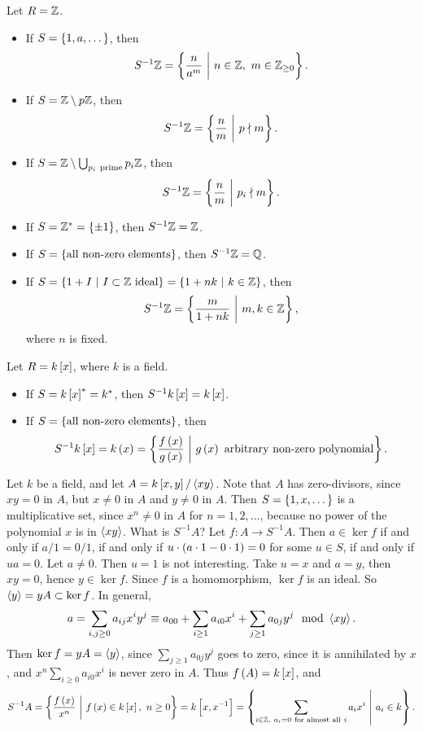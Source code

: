 \begin{example*}
Let $ R = \mathbb{Z} $.
\begin{itemize}
\item If $ S = \cbr{1, a, \dots} $, then
$$ S^{-1}\ZZ = \cbr{\dfrac{n}{a^m} \st n \in \ZZ, \ m \in \ZZ_{\ge 0}}. $$
\item If $ S = \mathbb{Z} \setminus p\mathbb{Z} $, then
$$ S^{-1}\ZZ = \cbr{\dfrac{n}{m} \st p \nmid m}. $$
\item If $ S = \ZZ \setminus \bigcup_{p_i \ \text{prime}} p_i\ZZ $, then
$$ S^{-1}\ZZ = \cbr{\dfrac{n}{m} \st p_i \nmid m}. $$
\item If $ S = \ZZ^* = \cbr{\pm 1} $, then $ S^{-1}\mathbb{Z} = \mathbb{Z} $.
\item If $ S = \cbr{\text{all non-zero elements}} $, then $ S^{-1}\mathbb{Z} = \mathbb{Q} $.
\item If $ S = \cbr{1 + I \st I \subset \ZZ \ \text{ideal}} = \cbr{1 + nk \st k \in \ZZ} $, then
$$ S^{-1}\ZZ = \cbr{\dfrac{m}{1 + nk} \st m, k \in \ZZ}, $$
where $ n $ is fixed.
\end{itemize}
\end{example*}

\begin{example*}
Let $ R = k\sbr{x} $, where $ k $ is a field.
\begin{itemize}
\item If $ S = k\sbr{x}^* = k^* $, then $ S^{-1}k\sbr{x} = k\sbr{x} $.
\item If $ S = \cbr{\text{all non-zero elements}} $, then
$$ S^{-1}k\sbr{x} = k\br{x} = \cbr{\dfrac{f\br{x}}{g\br{x}} \st g\br{x} \ \text{arbitrary non-zero polynomial}}. $$
\end{itemize}
\end{example*}

\begin{example}
Let $ k $ be a field, and let $ A = k\sbr{x, y} / \abr{xy} $. Note that $ A $ has zero-divisors, since $ xy = 0 $ in $ A $, but $ x \ne 0 $ in $ A $ and $ y \ne 0 $ in $ A $. Then $ S = \cbr{1, x, \dots} $ is a multiplicative set, since $ x^n \ne 0 $ in $ A $ for $ n = 1, 2, \dots $, because no power of the polynomial $ x $ is in $ \left\langle xy \right\rangle $. What is $ S^{-1}A $? Let $ f : A \to S^{-1}A $. Then $ a \in \ker f $ if and only if $ a / 1 = 0 / 1 $, if and only if $ u \cdot \br{a \cdot 1 - 0 \cdot 1} = 0 $ for some $ u \in S $, if and only if $ ua = 0 $. Let $ a \ne 0 $. Then $ u = 1 $ is not interesting. Take $ u = x $ and $ a = y $, then $ xy = 0 $, hence $ y \in \ker f $. Since $ f $ is a homomorphism, $ \ker f $ is an ideal. So $ \left\langle y \right\rangle = yA \subset \ker f $. In general,
$$ a = \sum_{i, j \ge 0} a_{ij}x^iy^j \equiv a_{00} + \sum_{i \ge 1} a_{i0}x^i + \sum_{j \ge 1} a_{0j}y^j \mod \abr{xy}. $$
Then $ \ker f = yA = \left\langle y \right\rangle $, since $ \sum_{j \ge 1} a_{0j}y^j $ goes to zero, since it is annihilated by $ x $, and $ x^n\sum_{i \ge 0} a_{i0}x^i $ is never zero in $ A $. Thus $ f\br{A} = k\sbr{x} $, and
$$ S^{-1}A = \cbr{\dfrac{f\br{x}}{x^n} \st f\br{x} \in k\sbr{x}, \ n \ge 0} = k\sbr{x, x^{-1}} = \cbr{\sum_{i \in \ZZ, \ a_i = 0 \ \text{for almost all} \ i} a_ix^i \st a_i \in k}. $$
\end{example}

